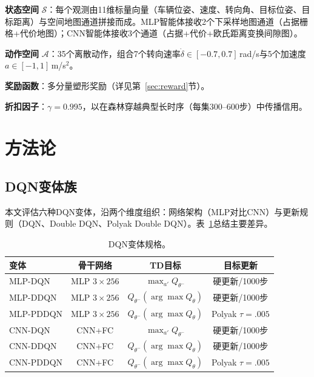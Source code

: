 \documentclass[conference]{IEEEtran}
\newcommand{\Qnet}{Q_\theta}
\newcommand{\Qtarget}{Q_{\theta^-}}
\begin{document}
\textbf{状态空间} $\mathcal{S}$：每个观测由11维标量向量（车辆位姿、速度、转向角、目标位姿、目标距离）与空间地图通道拼接而成。MLP智能体接收2个下采样地图通道（占据栅格+代价地图）；CNN智能体接收3个通道（占据+代价+欧氏距离变换间隙图）。

\textbf{动作空间} $\mathcal{A}$：35个离散动作，组合7个转向速率$\dot{\delta} \in [-0.7, 0.7]$\,rad/s与5个加速度$a \in [-1, 1]$\,m/s$^2$。

\textbf{奖励函数}：多分量塑形奖励（详见第~\ref{sec:reward}节）。

\textbf{折扣因子}：$\gamma = 0.995$，以在森林穿越典型长时序（每集300--600步）中传播信用。

\section{方法论}\label{sec:method}

\subsection{DQN变体族}\label{sec:variants}

本文评估六种DQN变体，沿两个维度组织：网络架构（MLP对比CNN）与更新规则（DQN、Double DQN、Polyak Double DQN）。表~\ref{tab:variants}总结主要差异。

\begin{table}[t]
\centering
\caption{DQN变体规格。}
\label{tab:variants}
\footnotesize
\begin{tabular}{@{}lccc@{}}
\toprule
\textbf{变体} & \textbf{骨干网络} & \textbf{TD目标} & \textbf{目标更新} \\
\midrule
MLP-DQN   & MLP $3{\times}256$ & $\max_{a'} \Qtarget$ & 硬更新/1000步 \\
MLP-DDQN  & MLP $3{\times}256$ & $\Qtarget(\arg\max \Qnet)$ & 硬更新/1000步 \\
MLP-PDDQN & MLP $3{\times}256$ & $\Qtarget(\arg\max \Qnet)$ & Polyak $\tau{=}.005$ \\
CNN-DQN   & CNN+FC             & $\max_{a'} \Qtarget$ & 硬更新/1000步 \\
CNN-DDQN  & CNN+FC             & $\Qtarget(\arg\max \Qnet)$ & 硬更新/1000步 \\
CNN-PDDQN & CNN+FC             & $\Qtarget(\arg\max \Qnet)$ & Polyak $\tau{=}.005$ \\
\bottomrule
\end{tabular}
\end{table}
\end{document}
